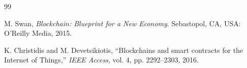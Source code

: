 
\begin{thebibliography}{99}
    
    M. Swan, \textit{Blockchain: Blueprint for a New Economy}.
    Sebastopol, CA, USA: O'Reilly Media, 2015.
    
    K. Christidis and M. Devetsikiotis,
    ``Blockchains and smart contracts for the Internet of Things,''
    \textit{IEEE Access}, vol. 4, pp. 2292--2303, 2016.

\end{thebibliography}
